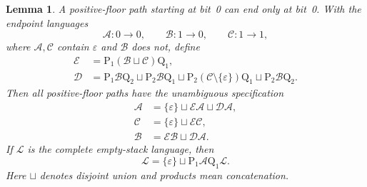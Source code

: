 \documentclass[11pt,a4paper]{article}
\newtheorem{lemma}[theorem]{Lemma}
\theoremstyle{remark}
\newcommand{\eps}{\varepsilon}
\newcommand{\PP}{\mathrm{P}}
\newcommand{\QQ}{\mathrm{Q}}
\newcommand{\Lang}[1]{\mathcal{#1}}
\begin{document}
\begin{lemma}\label{lem:endpoint}
A positive-floor path starting at bit~0 can end only at bit~0. With
the endpoint languages
\[
 \Lang A:0\longrightarrow0,\qquad
 \Lang B:1\longrightarrow0,\qquad
 \Lang C:1\longrightarrow1,
\]
where $\Lang A,\Lang C$ contain $\eps$ and $\Lang B$ does not, define
\begin{align}
 \Lang E&=\PP_1(\Lang B\sqcup\Lang C)\QQ_1,\label{eq:E}\\
 \Lang D&=\PP_1\Lang B\QQ_2
 \sqcup\PP_2\Lang B\QQ_1
 \sqcup\PP_2(\Lang C\setminus\{\eps\})\QQ_1
 \sqcup\PP_2\Lang B\QQ_2.\label{eq:D}
\end{align}
Then all positive-floor paths have the unambiguous specification
\begin{align}
 \Lang A&=\{\eps\}\sqcup\Lang E\Lang A\sqcup\Lang D\Lang A,
       \label{eq:A}\\
 \Lang C&=\{\eps\}\sqcup\Lang E\Lang C,\label{eq:C}\\
 \Lang B&=\Lang E\Lang B\sqcup\Lang D\Lang A.\label{eq:B}
\end{align}
If $\Lang L$ is the complete empty-stack language, then
\begin{equation}\label{eq:L}
 \Lang L=\{\eps\}\sqcup\PP_1\Lang A\QQ_1\Lang L.
\end{equation}
Here $\sqcup$ denotes disjoint union and products mean concatenation.
\end{lemma}
\end{document}

